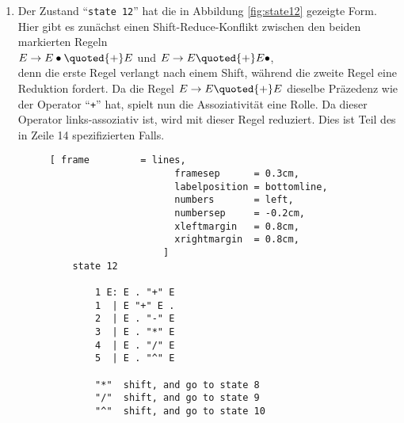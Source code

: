\begin{enumerate}
\item Der Zustand ``\texttt{state 12}'' hat die in Abbildung \ref{fig:state12} gezeigte Form.
      Hier gibt es zun\"achst einen Shift-Reduce-Konflikt zwischen den beiden markierten Regeln
      \\[0.2cm]
      \hspace*{1.3cm}
      $E \rightarrow E \bullet \quoted{+} E$ \quad und \quad
      $E \rightarrow E \quoted{+} E \bullet$, 
      \\[0.2cm]
      denn die erste Regel verlangt nach einem Shift, w\"ahrend die zweite Regel eine Reduktion fordert.
      Da die Regel $E \rightarrow E \quoted{+} E$ dieselbe Pr\"azedenz wie der Operator ``\texttt{+}''
      hat, spielt nun die Assoziativit\"at eine Rolle.  Da dieser Operator links-assoziativ ist, 
      wird mit dieser Regel reduziert.  Dies ist Teil des in Zeile 14 spezifizierten Falls.

    \begin{figure}[!ht]
    \centering
    \begin{Verbatim}[ frame         = lines, 
                      framesep      = 0.3cm, 
                      labelposition = bottomline,
                      numbers       = left,
                      numbersep     = -0.2cm,
                      xleftmargin   = 0.8cm,
                      xrightmargin  = 0.8cm,
                    ]
    state 12
    
        1 E: E . "+" E
        1  | E "+" E .
        2  | E . "-" E
        3  | E . "*" E
        4  | E . "/" E
        5  | E . "^" E
    
        "*"  shift, and go to state 8
        "/"  shift, and go to state 9
        "^"  shift, and go to state 10
    

\end{Verbatim}
\end{figure}
\end{enumerate}
